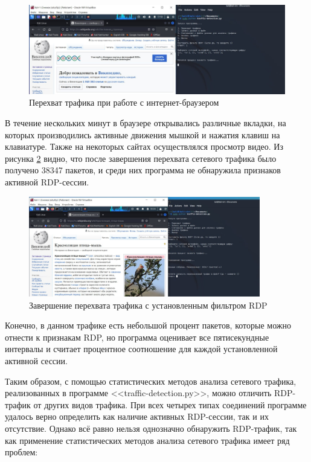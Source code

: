 \documentclass[bachelor, och, coursework]{SCWorks}
\begin{document}
\begin{figure}[H]
  \centering
  \includegraphics[width=1\textwidth]{photo/http.jpg}
  \caption{Перехват трафика при работе с интернет-браузером}
  \label{http}
\end{figure}

В течение нескольких минут в браузере открывались различные вкладки, на которых производились активные движения мышкой и
нажатия клавиш на клавиатуре. Также на некоторых сайтах осуществлялся просмотр видео. 
Из рисунка \ref{http1} видно, что после завершения перехвата сетевого трафика было получено 38347 пакетов, и среди них программа 
не обнаружила признаков активной RDP-сессии. 

\begin{figure}[H]
  \centering
  \includegraphics[width=0.9\textwidth]{photo/http2.jpg}
  \caption{Завершение перехвата трафика с установленным фильтром RDP}
  \label{http1}
\end{figure}

Конечно, в данном трафике есть небольшой процент пакетов, которые можно отнести к признакам RDP,
но программа оценивает все пятисекундные интервалы и считает процентное соотношение для каждой установленной активной сессии.


Таким образом, с помощью статистических методов анализа сетевого трафика, реализованных в программе <<traffic-detection.py>>, можно
отличить RDP-трафик от других видов трафика. При всех четырех типах соединений программе удалось верно определить как наличие активных RDP-сессии,
так и их отсутствие. Однако всё равно нельзя однозначно обнаружить RDP-трафик, так как применение статистических методов анализа сетевого трафика
имеет ряд проблем:
\end{document}
